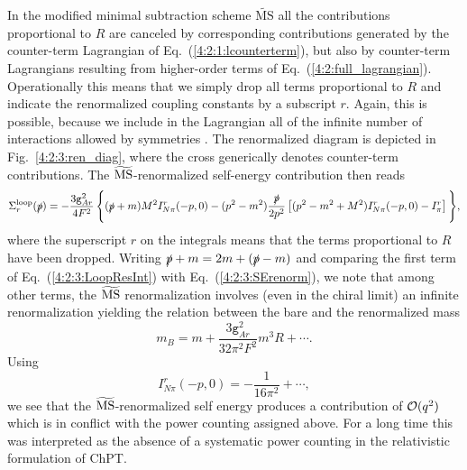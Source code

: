 \documentclass[twoside,12pt]{article}
\begin{document}
   In the modified minimal subtraction scheme $\widetilde{\mbox{MS}}$ all the
contributions proportional to $R$ are canceled by corresponding contributions
generated by the counter-term Lagrangian of Eq.~(\ref{4:2:1:lcounterterm}), but also
by counter-term Lagrangians resulting from higher-order terms of
Eq.~(\ref{4:2:full_lagrangian}).
   Operationally this means that we simply drop all terms proportional to
$R$ and indicate the renormalized coupling constants by a subscript $r$.
   Again, this is possible, because we include in the Lagrangian all
of the infinite number of interactions allowed by symmetries
\cite{Weinberg:1995mt}.
   The renormalized diagram is depicted in Fig.~\ref{4:2:3:ren_diag}, where
the cross generically denotes counter-term contributions.
   The $\widetilde{\rm MS}$-renormalized self-energy contribution then reads
\begin{equation}
\label{4:2:3:SErenorm}
\Sigma^{\rm
loop}_r(\slashed{p})=-\frac{3\texttt{g}_{Ar}^2}{4F^2}\,\Bigg\{
(\slashed{p}+m)M^2
I_{N\pi}^r(-p,0)
-(p^2-m^2)\frac{\slashed{p}}{2p^2}
\left[(p^2-m^2+M^2)I_{N\pi}^r(-p,0)-I_\pi^r\right]\Bigg\},
\end{equation}
where the superscript $r$ on the integrals means that the terms
proportional to $R$ have been dropped.
   Writing $\slashed{p}+m=2m+(\slashed p-m)$ and comparing the first term
of Eq.~(\ref{4:2:3:LoopResInt}) with Eq.~(\ref{4:2:3:SErenorm}), we
note that among other terms, the $\widetilde{\rm MS}$ renormalization
involves (even in the chiral limit) an infinite renormalization
yielding the relation between the bare and the renormalized mass
\cite{Gasser:1987rb}
\begin{displaymath}
m_B=m+\frac{3\texttt{g}_{Ar}^2}{32\pi^2 F^2}m^3 R+\cdots.
\end{displaymath}
Using
\begin{displaymath}
I_{N\pi}^r(-p,0)=-\frac{1}{16\pi^2}+\cdots,
\end{displaymath}
we see that the $\widetilde{\rm MS}$-renormalized self energy produces a contribution
of ${\cal O}(q^2)$ which is in conflict with the power counting assigned above.
   For a long time this was interpreted as the absence of a systematic power counting in the
relativistic formulation of ChPT.
\end{document}
